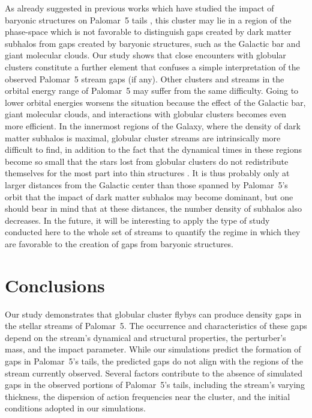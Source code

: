 \documentclass{aa}
\begin{document}
  As already suggested in previous works which have studied the impact of baryonic structures on Palomar~5 tails \citep{2017NatAs...1..633P, 2019MNRAS.484.2009B}, this cluster may lie in a region of the phase-space which is not favorable to distinguish gaps created by dark matter subhalos from gaps created by baryonic structures, such as the Galactic bar and giant molecular clouds. Our study shows that close encounters with globular clusters constitute a further element that confuses a simple interpretation of the observed Palomar~5 stream gaps (if any). Other clusters and streams in the orbital energy range of Palomar~5 may suffer from the same difficulty. Going to lower orbital energies worsens the situation because the effect of the Galactic bar, giant molecular clouds, and interactions with globular clusters becomes even more efficient. In the innermost regions of the Galaxy, where the density of dark matter subhalos is maximal, globular cluster streams are intrinsically more difficult to find, in addition to the fact that the dynamical times in these regions become so small that the stars lost from globular clusters do not redistribute themselves for the most part into thin structures \citep[see][]{2023A&A...673A..44F}. It is thus probably only at larger distances from the Galactic center than those spanned by Palomar~5's orbit that the impact of dark matter subhalos may become dominant, but one should bear in mind that at these distances, the number density of subhalos also decreases. In the future, it will be interesting to apply the type of study conducted here to the whole set of streams to quantify the regime in which they are favorable to the creation of gaps from baryonic structures.
  

  
\section{Conclusions}
  Our study demonstrates that globular cluster flybys can produce density gaps in the stellar streams of Palomar~5. The occurrence and characteristics of these gaps depend on the stream's dynamical and structural properties, the perturber's mass, and the impact parameter. While our simulations predict the formation of gaps in Palomar~5's tails, the predicted gaps do not align with the regions of the stream currently observed. Several factors contribute to the absence of simulated gaps in the observed portions of Palomar~5's tails, including the stream's varying thickness, the dispersion of action frequencies near the cluster, and the initial conditions adopted in our simulations. 
\end{document}
